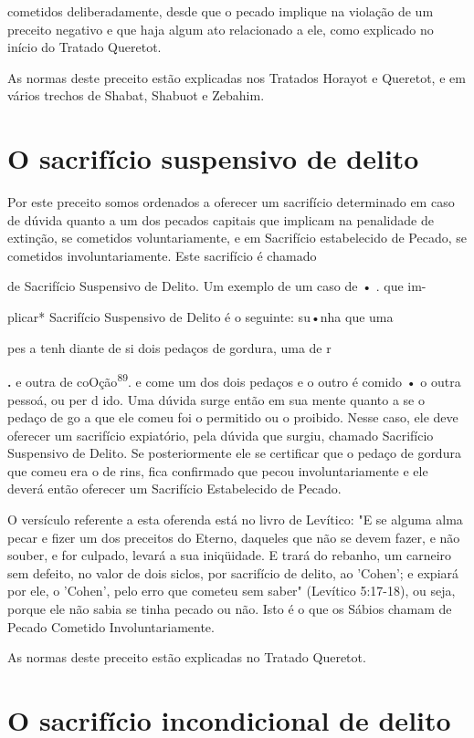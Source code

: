 cometidos deliberadamente, desde que o pecado implique na violação de um
preceito negativo e que haja algum ato relacionado a ele, como explicado
no início do Tratado Queretot.

As normas deste preceito estão explicadas nos Tratados Horayot e
Queretot, e em vários trechos de Shabat, Shabuot e Zebahim.

\section{O sacrifício suspensivo de delito}

Por este preceito somos ordenados a oferecer um sacrifício determi­nado
em caso de dúvida quanto a um dos pecados capitais que implicam na
penalidade de extinção, se cometidos voluntariamente, e em Sacrifício
estabe­lecido de Pecado, se cometidos involuntariamente. Este sacrifício
é chamado

de Sacrifício Suspensivo de Delito. Um exemplo de um caso de • . que im-

plicar* Sacrifício Suspensivo de Delito é o seguinte: su•nha que uma

pes a tenh diante de si dois pedaços de gordura, uma de r

\textbf{.} e outra de coOção\textsuperscript{89}. e
come um dos dois pedaços e o outro é comido • o outra pes­soá, ou per d
ido. Uma dúvida surge então em sua mente quanto a se o pedaço de go a
que ele comeu foi o permitido ou o proibido. Nesse caso, ele deve
oferecer um sacrifício expiatório, pela dúvida que surgiu, chamado
Sacrifício Suspensivo de Delito. Se posteriormente ele se certificar que
o pedaço de gor­dura que comeu era o de rins, fica confirmado que pecou
involuntariamente e ele deverá então oferecer um Sacrifício Estabelecido
de Pecado.

O versículo referente a esta oferenda está no livro de Levítico: "E se
alguma alma pecar e fizer um dos preceitos do Eterno, daqueles que não
se devem fazer, e não souber, e for culpado, levará a sua iniqüidade. E
trará do rebanho, um carneiro sem defeito, no valor de dois siclos, por
sacrifício de de­lito, ao 'Cohen'; e expiará por ele, o 'Cohen', pelo
erro que cometeu sem sa­ber" (Levítico 5:17-18), ou seja, porque ele não
sabia se tinha pecado ou não. Isto é o que os Sábios chamam de Pecado
Cometido Involuntariamente.


As normas deste preceito estão explicadas no Tratado Queretot.


\section{O sacrifício incondicional de delito}

